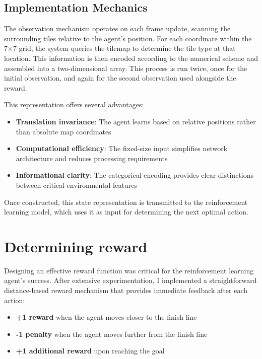 \subsection{Implementation Mechanics}

The observation mechanism operates on each frame update, scanning the surrounding tiles relative to the agent's position. 
For each coordinate within the 7×7 grid, the system queries the tilemap to determine the tile type at that location. 
This information is then encoded according to the numerical scheme and assembled into a two-dimensional array.
This process is run twice, once for the initial observation, and again for the second observation used alongside the reward.

This representation offers several advantages:
\begin{itemize}
    \item \textbf{Translation invariance}: The agent learns based on relative positions rather than absolute map coordinates
    \item \textbf{Computational efficiency}: The fixed-size input simplifies network architecture and reduces processing requirements
    \item \textbf{Informational clarity}: The categorical encoding provides clear distinctions between critical environmental features
\end{itemize}

Once constructed, this state representation is transmitted to the reinforcement learning model, which uses it as input for determining the next optimal action. 

\section{Determining reward}
Designing an effective reward function was critical for the reinforcement learning agent's success. After extensive experimentation, I implemented a straightforward distance-based reward mechanism that provides immediate feedback after each action:

\begin{itemize}
    \item \textbf{+1 reward} when the agent moves closer to the finish line
    \item \textbf{-1 penalty} when the agent moves further from the finish line
    \item \textbf{+1 additional reward} upon reaching the goal
\end{itemize}

